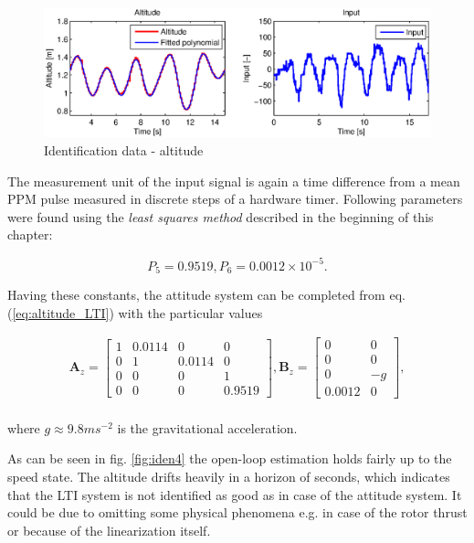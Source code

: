 \begin{figure}[h]
\includegraphics[width=1\textwidth]{fig/iden3.eps} 
\caption{Identification data - altitude}
\label{fig:iden3}
\end{figure}

The measurement unit of the input signal is again a time difference from a mean PPM pulse measured in discrete steps of a hardware timer. Following parameters were found using the \emph{least squares method} described in the beginning of this chapter:

\begin{equation}
P_5 = 0.9519, P_6 = 0.0012 \times 10^{-5}.
\label{eq:constants2}
\end{equation}

Having these constants, the attitude system can be completed from eq. (\ref{eq:altitude_LTI}) with the particular values

\begin{equation}
\begin{split}
\mathbf{A}_{z} = \begin{bmatrix}
1 & 0.0114 & 0 & 0\\
0 & 1 & 0.0114 & 0\\
0 & 0 & 0 & 1 \\
0 & 0 & 0 & 0.9519
\end{bmatrix}, \mathbf{B}_{z} = \begin{bmatrix}
0 & 0\\
0 & 0\\
0 & -g\\
0.0012 & 0
\end{bmatrix},
\end{split}
\label{eq:altitude_LTI_with_constants}
\end{equation}
\\
where $g \approx 9.8 ms^{-2}$ is the gravitational acceleration.

As can be seen in fig. \ref{fig:iden4} the open-loop estimation holds fairly up to the speed state. The altitude drifts heavily in a horizon of seconds, which indicates that the LTI system is not identified as good as in case of the attitude system. It could be due to omitting some physical phenomena e.g. in case of the rotor thrust or because of the linearization itself.

